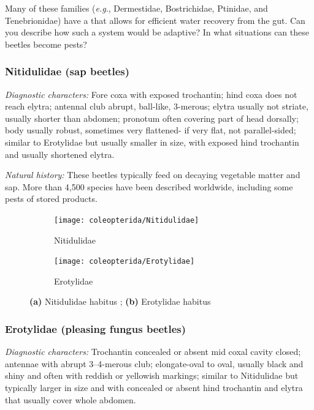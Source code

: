 \begin{theo}
{}Many of these families (\textit{e.g}., Dermestidae, Bostrichidae, Ptinidae, and Tenebrionidae) have a  that allows for efficient water recovery from the gut. Can you describe how such a system would be adaptive? In what situations can these beetles become pests?
\end{theo}

\subsubsection{Nitidulidae (sap beetles)}
\noindent{}\textit{Diagnostic characters:} Fore coxa with exposed trochantin; hind coxa does not reach elytra; antennal club abrupt, ball-like, 3-merous; elytra usually not striate, usually shorter than abdomen; pronotum often covering part of head dorsally; body usually robust, sometimes very flattened- if very flat, not parallel-sided; similar to Erotylidae but usually smaller in size, with exposed hind trochantin and usually shortened elytra.\vspace{3mm}

\noindent{}\textit{Natural history:} These beetles typically feed on decaying vegetable matter and sap. More than 4,500 species have been described worldwide, including some pests of stored products.

\begin{figure}[ht!]
  \centering
\begin{subfigure}[ht!]{0.4\textwidth}
    \texttt{[image: coleopterida/Nitidulidae]}
  \caption{Nitidulidae}
  \label{fig:nitidulid}
\end{subfigure}
    \hfill
\begin{subfigure}[ht!]{0.46\textwidth}
    \texttt{[image: coleopterida/Erotylidae]}
  \caption{Erotylidae}
  \label{fig:erotylid}\end{subfigure}
    \caption{\textbf{(a)} Nitidulidae habitus \citep[modified from][Fig. 71]{bhlitem64043}; \textbf{(b)} Erotylidae habitus \citep[modified from][Fig. 11]{heller1918beitrag}}\label{fig:erotylnitid}
\end{figure}

\subsubsection{Erotylidae (pleasing fungus beetles)}
\noindent{}\textit{Diagnostic characters:} Trochantin concealed or absent mid coxal cavity closed; antennae with abrupt 3--4-merous club; elongate-oval to oval, usually black and shiny and often with reddish or yellowish markings; similar to Nitidulidae but typically larger in size and with concealed or absent hind trochantin and elytra that usually cover whole abdomen.\vspace{3mm}

